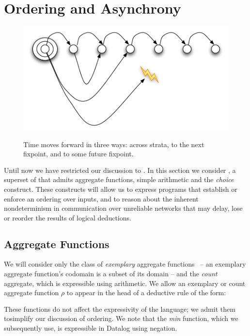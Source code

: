 \section{Ordering and Asynchrony}

\begin{figure}[t]
  \centering
  \includegraphics[width=0.75\linewidth]{figures/dedalus-time.pdf}
  \label{fig:dedalus-time}
  \caption{Time moves forward in three ways: across strata, to the next fixpoint, and to some future fixpoint.}
\vspace{-8pt}
\end{figure}

Until now we have restricted our discussion to \slang.  In this section we
consider \lang, a superset of \slang that admits aggregate functions, simple
arithmetic and the \emph{choice} construct.  These constructs will allow us to
express programs that establish or enforce an ordering over inputs, and to
reason about the inherent nondeterminism in communication over unreliable
networks that may delay, lose or reorder the results of logical deductions.

\subsection{Aggregate Functions}

We will consider only the class of \emph{exemplary} aggregate
functions~\cite{tag} -- an exemplary aggregate function's codomain is a subset
of its domain -- and the \emph{count} aggregate, which is expressible using
arithmetic.  We allow an exemplary or count aggregate function $\rho$ to appear
in the head of a deductive rule of the form:

\linebreak{}

These functions do not affect the expressivity of the language; we admit them
tosimplify our discussion of ordering.  We note that the \emph{min} function,
which we subsequently use, is expressible in Datalog using negation.

